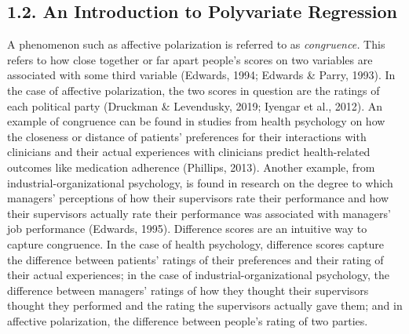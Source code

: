 \documentclass[authordate, meta, issue]{jote-new-article}
\begin{document}
	\subsection{1.2. An Introduction to Polyvariate Regression}



	A phenomenon such as affective polarization is referred to as \emph{congruence. }This refers to how close together or far apart people's scores on two variables are associated with some third variable (Edwards, 1994; Edwards \& Parry, 1993). In the case of affective polarization, the two scores in question are the ratings of each political party (Druckman \& Levendusky, 2019; Iyengar et al., 2012). An example of congruence can be found in studies from health psychology on how the closeness or distance of patients' preferences for their interactions with clinicians and their actual experiences with clinicians predict health-related outcomes like medication adherence (Phillips, 2013). Another example, from industrial-organizational psychology, is found in research on the degree to which managers' perceptions\emph{ }of how their supervisors rate their performance and how their supervisors actually\emph{ }rate their performance was associated with managers' job performance (Edwards, 1995). Difference scores are an intuitive way to capture congruence. In the case of health psychology, difference scores capture the difference between patients' ratings of their preferences and their rating of their actual experiences; in the case of industrial-organizational psychology, the difference between managers' ratings of how they thought their supervisors thought they performed and the rating the supervisors actually gave them; and in affective polarization, the difference between people's rating of two parties.
\end{document}
